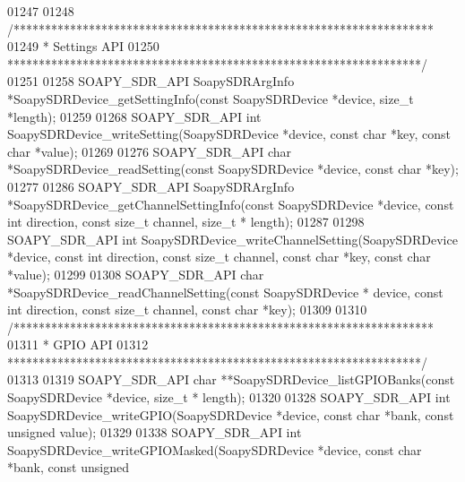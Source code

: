 \begin{DoxyCode}
01247 
01248 \textcolor{comment}{/*******************************************************************}
01249 \textcolor{comment}{ * Settings API}
01250 \textcolor{comment}{ ******************************************************************/}
01251 
01258 SOAPY_SDR_API SoapySDRArgInfo *SoapySDRDevice_getSettingInfo(\textcolor{keyword}{const} 
      SoapySDRDevice *device, \textcolor{keywordtype}{size\_t} *length);
01259 
01268 SOAPY_SDR_API \textcolor{keywordtype}{int} SoapySDRDevice_writeSetting(SoapySDRDevice *device, \textcolor{keyword}{const} \textcolor{keywordtype}{char} *key, \textcolor{keyword}{const} \textcolor{keywordtype}{char} *value);
01269 
01276 SOAPY_SDR_API \textcolor{keywordtype}{char} *SoapySDRDevice_readSetting(\textcolor{keyword}{const} SoapySDRDevice *device, \textcolor{keyword}{const} \textcolor{keywordtype}{char} *key);
01277 
01286 SOAPY_SDR_API SoapySDRArgInfo *SoapySDRDevice_getChannelSettingInfo(\textcolor{keyword}{const} 
      SoapySDRDevice *device, \textcolor{keyword}{const} \textcolor{keywordtype}{int} direction, \textcolor{keyword}{const} \textcolor{keywordtype}{size\_t} channel, \textcolor{keywordtype}{size\_t} *
      length);
01287 
01298 SOAPY_SDR_API \textcolor{keywordtype}{int} SoapySDRDevice_writeChannelSetting(SoapySDRDevice *device, \textcolor{keyword}{const} \textcolor{keywordtype}{int} direction, \textcolor{keyword}{const} \textcolor{keywordtype}{
      size\_t} channel, \textcolor{keyword}{const} \textcolor{keywordtype}{char} *key, \textcolor{keyword}{const} \textcolor{keywordtype}{char} *value);
01299 
01308 SOAPY_SDR_API \textcolor{keywordtype}{char} *SoapySDRDevice_readChannelSetting(\textcolor{keyword}{const} SoapySDRDevice *
      device, \textcolor{keyword}{const} \textcolor{keywordtype}{int} direction, \textcolor{keyword}{const} \textcolor{keywordtype}{size\_t} channel, \textcolor{keyword}{const} \textcolor{keywordtype}{char} *key);
01309 
01310 \textcolor{comment}{/*******************************************************************}
01311 \textcolor{comment}{ * GPIO API}
01312 \textcolor{comment}{ ******************************************************************/}
01313 
01319 SOAPY_SDR_API \textcolor{keywordtype}{char} **SoapySDRDevice_listGPIOBanks(\textcolor{keyword}{const} SoapySDRDevice *device, \textcolor{keywordtype}{size\_t} *
      length);
01320 
01328 SOAPY_SDR_API \textcolor{keywordtype}{int} SoapySDRDevice_writeGPIO(SoapySDRDevice *device, \textcolor{keyword}{const} \textcolor{keywordtype}{char} *bank, \textcolor{keyword}{const} \textcolor{keywordtype}{unsigned} value);
01329 
01338 SOAPY_SDR_API \textcolor{keywordtype}{int} SoapySDRDevice_writeGPIOMasked(SoapySDRDevice *device, \textcolor{keyword}{const} \textcolor{keywordtype}{char} *bank, \textcolor{keyword}{const} \textcolor{keywordtype}{unsigned} 

\end{DoxyCode}

